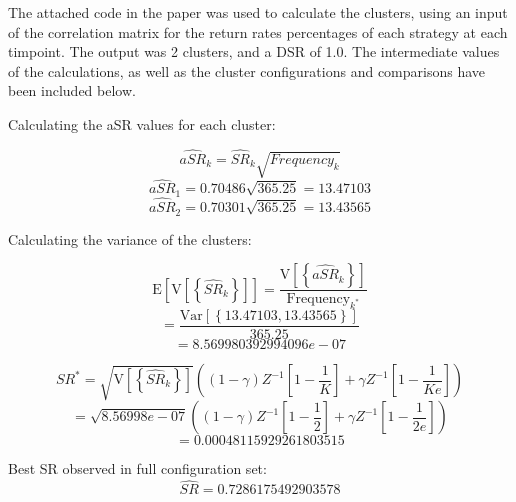 \documentclass[a4paper,11pt,oneside]{article}
\theoremstyle{plain}
\theoremstyle{definition}
\begin{document}
	The attached code in the paper was used to calculate the clusters, using an input of the correlation matrix for the return rates percentages of each strategy at each timpoint. The output was 2 clusters, and a DSR of 1.0. The intermediate values of the calculations, as well as the cluster configurations and comparisons have been included below.\newline
	
	Calculating the aSR values for each cluster:
	
	\begin{equation}
	\widehat{aSR}_{k}=\widehat{SR}_{k}\sqrt{{Frequency_{k}}}
	\end{equation}
	\begin{equation}
	\widehat{aSR}_{1}={0.70486}\sqrt{{365.25}}={13.47103}
	\end{equation}
	\begin{equation}
	\widehat{aSR}_{2}={0.70301}\sqrt{{365.25}} ={13.43565}
	\end{equation}
	
	Calculating the variance of the clusters:
	
	\begin{equation}
	\mathrm{E}\left[\mathrm{V}\left[\left\{\widehat{S R}_{k}\right\}\right]\right]=\frac{\mathrm{V}\left[\left\{\widehat{aSR}_{k}\right\}\right]}{\text {Frequency}_{k^{*}}}
	\end{equation}
	\begin{equation}
	=\frac{\mathrm{Var}\left[\left\{{13.47103,13.43565} \right\}\right]}{\text {365.25}}
	\end{equation}
	\begin{equation}
	={8.569980392994096e-07}
	\end{equation}
	
	\begin{equation}
	S R^{*}=\sqrt{\mathrm{V}\left[\left\{\widehat{S R}_{k}\right\}\right]}\left((1-\gamma) Z^{-1}\left[1-\frac{1}{K}\right]+\gamma Z^{-1}\left[1-\frac{1}{K e}\right]\right)
	\end{equation}
	\begin{equation}
	=\sqrt{{8.56998e-07}}\left((1-\gamma) Z^{-1}\left[1-\frac{1}{2}\right]+\gamma Z^{-1}\left[1-\frac{1}{2 e}\right]\right)
	\end{equation}
	\begin{equation}
	=0.00048115929261803515
	\end{equation}
	
	Best SR observed in full configuration set:
	\begin{equation}
	\widehat{S R}=0.7286175492903578
	\end{equation}
	
\end{document}
